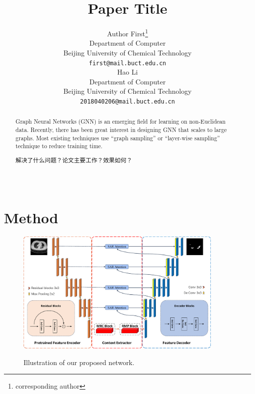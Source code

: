 \documentclass[UTF8]{article} %
\title{Paper Title}
\author{%
  Author First\thanks{corresponding author} \\
  Department of Computer \\
  Beijing University of Chemical Technology \\
  \texttt{first@mail.buct.edu.cn} \\
  \And
  Hao Li \\  
  Department of Computer \\
  Beijing University of Chemical Technology \\
  \texttt{2018040206@mail.buct.edu.cn} \\
}
\begin{document}
\maketitle

\begin{abstract}
Graph Neural Networks (GNN) is an emerging field for learning on non-Euclidean data. Recently, there has been great interest in designing GNN that scales to large graphs. Most existing techniques use ``graph sampling'' or ``layer-wise sampling'' technique to reduce training time. 

解决了什么问题？论文主要工作？效果如何？
~\\
~\\
~\\
\end{abstract}
\section{Method}

\begin{figure}[ht]
  \begin{center}
  \includegraphics[width=0.9\textwidth]{overview.pdf}
  \vspace{-2mm}
  \caption{Illustration of our proposed network.} 
  \vspace{-2mm}
  \label{fig:overview}
  \end{center}
  \vspace{-0.35cm}
\end{figure}
\end{document}
